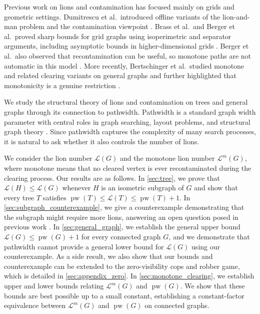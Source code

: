 \documentclass[a4paper,UKenglish,cleveref, autoref, thm-restate]{lipics-v2021}
\begin{document}
Previous work on lions and contamination has focused mainly on grids and geometric settings. Dumitrescu et al.\ introduced offline variants of the lion-and-man problem and the contamination viewpoint \cite{Dumitrescu07}. Brass et al.\ and Berger et al.\ proved sharp bounds for grid graphs using isoperimetric and separator arguments, including asymptotic bounds in higher-dimensional grids \cite{Berger09,Brass07}. Berger et al.\ also observed that recontamination can be useful, so monotone paths are not automatic in this model \cite{Berger09}. More recently, Bertschinger et al.\ studied monotone and related clearing variants on general graphs and further highlighted that monotonicity is a genuine restriction \cite{Bertschinger23}.

We study the structural theory of lions and contamination on trees and general graphs through its connection to pathwidth. Pathwidth is a standard graph width parameter with central roles in graph searching, layout problems, and structural graph theory \cite{Bienstock91,Kinnersley92,RobertsonI}. Since pathwidth captures the complexity of many search processes, it is natural to ask whether it also controls the number of lions.

We consider the lion number \(\mathcal{L}(G)\) and the monotone lion number \(\mathcal{L}^m(G)\), where monotone means that no cleared vertex is ever recontaminated during the clearing process. Our results are as follows. In \cref{sec:tree}, we prove that \(\mathcal{L}(H)\le \mathcal{L}(G)\) whenever \(H\) is an isometric subgraph of \(G\) and show that every tree \(T\) satisfies \(\operatorname{pw}(T)\le \mathcal{L}(T)\le \operatorname{pw}(T)+1\).
In \cref{sec:subgraph_counterexample}, we give a counterexample demonstrating that the subgraph might require more lions, answering an open question posed in previous work \cite{adams2022lions}.
In \cref{sec:general_graph}, we establish the general upper bound \(\mathcal{L}(G)\le \operatorname{pw}(G)+1\) for every connected graph \(G\), and we demonstrate that pathwidth cannot provide a general lower bound for \(\mathcal{L}(G)\) using our counterexample. As a side result, we also show that our bounds and counterexample can be extended to the zero-visibility cops and robber game, which is detailed in \cref{sec:appendix_zero}. In \cref{sec:monotone_clearing}, we establish upper and lower bounds relating \(\mathcal{L}^m(G)\) and \(\operatorname{pw}(G)\). 
We show that these bounds are best possible up to a small constant, establishing a constant-factor equivalence between $\mathcal{L}^m(G)$ and $\operatorname{pw}(G)$ on connected graphs.
\end{document}
